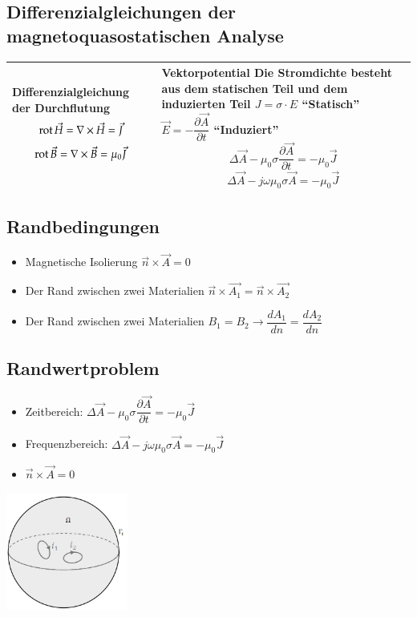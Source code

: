 \subsection{Differenzialgleichungen der magnetoquasostatischen Analyse}
\begin{tabular}{|p{} |p{}|}
	\hline
	\textbf{Differenzialgleichung der Durchflutung}\newline
	\[\operatorname{rot} \vec{H}=\nabla \times \vec{H}=\vec{J}\]
	\[\operatorname{rot} \vec{B}=\nabla \times \vec{B}=\mu_{0}\vec{J}\]&
	\textbf{Vektorpotential}\newline
	Die Stromdichte besteht aus dem statischen Teil und dem induzierten Teil\newline
	$J=\sigma \cdot E $ ``Statisch''\newline
	$\vec{E}=-\dfrac{\partial \vec{A}}{\partial t}$ ``Induziert''
	\[\Delta\vec{A}-\mu_{0}\sigma \dfrac{\partial \vec{A}}{\partial t}=-\mu_{0}\vec{J}\]
	\[\Delta\vec{A}-j\omega\mu_{0}\sigma\vec{A}=-\mu_{0}\vec{J}\]\\
	\hline
\end{tabular}
\subsection{Randbedingungen}
\begin{itemize}
	\item Magnetische Isolierung $\vec{n} \times \vec{A} =0$
	\item Der Rand zwischen zwei Materialien $\vec{n} \times \vec{A_{1}}=\vec{n} \times \vec{A_{2}}$
	\item Der Rand zwischen zwei Materialien $B_{1}=B_{2} \rightarrow \dfrac{dA_{1}}{d n}=\dfrac{dA_{2}}{d n} $
\end{itemize}
\subsection{Randwertproblem}
\begin{minipage}{9cm}
	\begin{itemize}
		\item Zeitbereich: $\Delta\vec{A}-\mu_{0}\sigma \dfrac{\partial \vec{A}}{\partial
		 t}=-\mu_{0}\vec{J}$
		\item Frequenzbereich: $\Delta\vec{A}-j\omega\mu_{0}\sigma\vec{A}=-\mu_{0}\vec{J}$
		\item $\vec{n} \times \vec{A} =0$
	\end{itemize}	
\end{minipage}
\begin{minipage}{8cm}
	\includegraphics[width=4cm]{images/Randwertproblem.jpg}
\end{minipage}
